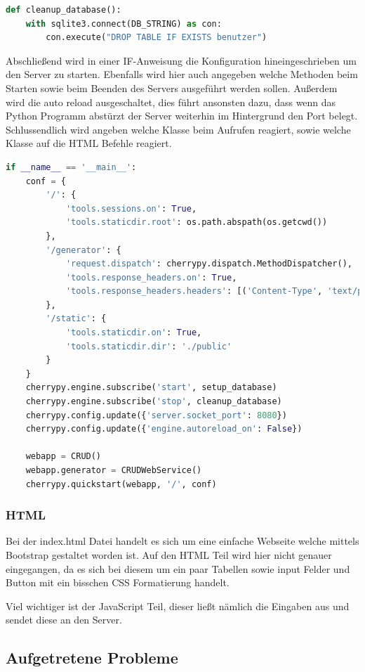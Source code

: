 \begin{lstlisting}[language=Python, caption=Löschen der Tabelle benutzer beim Beenden des Servers]
def cleanup_database():
	with sqlite3.connect(DB_STRING) as con:
		con.execute("DROP TABLE IF EXISTS benutzer")
\end{lstlisting}

Abschließend wird in einer IF-Anweisung die Konfiguration hineingeschrieben um den Server zu starten. Ebenfalls wird hier auch angegeben welche Methoden beim Starten sowie beim Beenden des Servers ausgeführt werden sollen. Außerdem wird die auto reload ausgeschaltet, dies führt ansonsten dazu, dass wenn das Python Programm abstürzt der Server weiterhin im Hintergrund den Port belegt. Schlussendlich wird angeben welche Klasse beim Aufrufen reagiert, sowie welche Klasse auf die HTML Befehle reagiert.  

\begin{lstlisting}[language=Python, caption=Konfiguration des Servers]
if __name__ == '__main__':
	conf = {
		'/': {
			'tools.sessions.on': True,
			'tools.staticdir.root': os.path.abspath(os.getcwd())
		},
		'/generator': {
			'request.dispatch': cherrypy.dispatch.MethodDispatcher(),
			'tools.response_headers.on': True,
			'tools.response_headers.headers': [('Content-Type', 'text/plain')],
		},
		'/static': {
			'tools.staticdir.on': True,
			'tools.staticdir.dir': './public'
		}
	}
	cherrypy.engine.subscribe('start', setup_database)
	cherrypy.engine.subscribe('stop', cleanup_database)
	cherrypy.config.update({'server.socket_port': 8080})
	cherrypy.config.update({'engine.autoreload_on': False})
	
	webapp = CRUD()
	webapp.generator = CRUDWebService()
	cherrypy.quickstart(webapp, '/', conf)
\end{lstlisting}

\subsubsection{HTML}

Bei der index.html Datei handelt es sich um eine einfache Webseite welche mittels Bootstrap gestaltet worden ist. Auf den HTML Teil wird hier nicht genauer eingegangen, da es sich bei diesem um ein paar Tabellen sowie input Felder und Button mit ein bisschen CSS Formatierung handelt.

Viel wichtiger ist der JavaScript Teil, dieser ließt nämlich die Eingaben aus und sendet diese an den Server.

\subsection{Aufgetretene Probleme}

